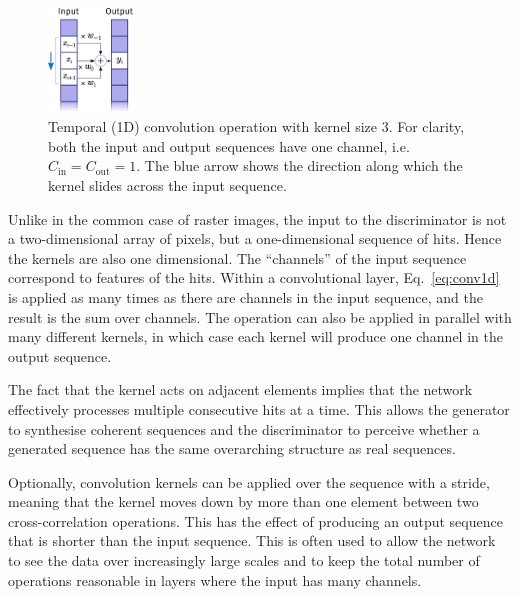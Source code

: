 \begin{figure}
    \centering
    \includegraphics[width=0.20\textwidth]{chapter4/1d_convolution.pdf}
    \caption{Temporal (1D) convolution operation with kernel size 3. For
    clarity, both the input and output sequences have one channel, i.e.\
    $C_\mathrm{in} = C_\mathrm{out} = 1$. The blue arrow shows the direction along
    which the kernel slides across the input sequence.}
    \label{fig:temporal_conv}
\end{figure}


Unlike in the common case of raster images, the input to the discriminator is
not a two-dimensional array of pixels, but a one-dimensional sequence of hits.
Hence the kernels are also one dimensional. The ``channels'' of the input
sequence correspond to features of the hits. Within a convolutional layer,
Eq.~\ref{eq:conv1d} is applied as many times as there are channels in the input
sequence, and the result is the sum over channels. The operation can also be
applied in parallel with many different kernels, in which case each kernel will
produce one channel in the output sequence.


The fact that the kernel acts on adjacent elements implies that the network
effectively processes multiple consecutive hits at a time. This allows the
generator to synthesise coherent sequences and the discriminator to perceive
whether a generated sequence has the same overarching structure as real
sequences.

Optionally, convolution kernels can be applied over the sequence with a stride,
meaning that the kernel moves down by more than one element between two
cross-correlation operations. This has the effect of producing an output
sequence that is shorter than the input sequence. This is often used to allow
the network to see the data over increasingly large scales and to keep the total
number of operations reasonable in layers where the input has many channels.

